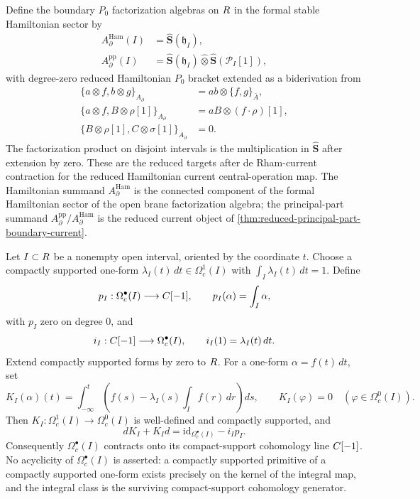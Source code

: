 \documentclass[11pt]{memoir}
\begin{document}
\begin{constr}
  Define the boundary $P_0$ factorization algebras on $R$ in the
  formal stable Hamiltonian sector by
  \begin{align*}
    A_\partial^{\mathrm{Ham}}(I)
      &=\widehat{\mathbf S}(\mathfrak h_I),\\
    A_\partial^{\mathrm{pp}}(I)
      &=\widehat{\mathbf S}(\mathfrak h_I)\widehat\otimes
        \widehat{\mathbf S}(\mathcal P_I[1]),
  \end{align*}
  with degree-zero reduced Hamiltonian \(P_0\) bracket extended as a
  biderivation from
  \begin{align*}
    \{a\otimes f,b\otimes g\}_{A_\partial}&=ab\otimes\{f,g\}_{\bar A},\\
    \{a\otimes f,B\otimes\rho[1]\}_{A_\partial}
      &=aB\otimes(f\cdot\rho)[1],\\
    \{B\otimes\rho[1],C\otimes\sigma[1]\}_{A_\partial}&=0.
  \end{align*}
  The factorization product on disjoint intervals is the multiplication
  in $\widehat{\mathbf S}$ after extension by zero. These are the
  reduced targets after de Rham-current contraction for the reduced
  Hamiltonian current central-operation map. The Hamiltonian summand
  $A_\partial^{\mathrm{Ham}}$ is the connected component of the formal
  Hamiltonian sector of the open brane factorization algebra; the
  principal-part summand
  $A_\partial^{\mathrm{pp}}/A_\partial^{\mathrm{Ham}}$ is the reduced
  current object of
    \ref{thm:reduced-principal-part-boundary-current}.
\end{constr}

\begin{lem}
  \label{lem:compact-support-interval-contraction}
  Let \(I\subset R\) be a nonempty open interval, oriented by the coordinate
  \(t\). Choose a compactly supported one-form
  \(\lambda_I(t)\,dt\in\Omega^1_c(I)\) with
  \(\int_I\lambda_I(t)\,dt=1\). Define
  \[
    p_I:\Omega_c^\bullet(I)\longrightarrow C[-1],\qquad
    p_I(\alpha)=\int_I\alpha,
  \]
  with \(p_I\) zero on degree \(0\), and
  \[
    i_I:C[-1]\longrightarrow\Omega_c^\bullet(I),\qquad
    i_I(1)=\lambda_I(t)\,dt.
  \]
  Extend compactly supported forms by zero to \(R\). For a one-form
  \(\alpha=f(t)\,dt\), set
  \[
    K_I(\alpha)(t)
      =
      \int_{-\infty}^{t}
      \left(f(s)-\lambda_I(s)\int_I f(r)\,dr\right)ds,
    \qquad
    K_I(\varphi)=0\quad(\varphi\in\Omega^0_c(I)).
  \]
  Then \(K_I:\Omega^1_c(I)\to\Omega^0_c(I)\) is well-defined and
  compactly supported, and
  \[
    dK_I+K_I d=\mathrm{id}_{\Omega_c^\bullet(I)}-i_Ip_I.
  \]
  Consequently \(\Omega_c^\bullet(I)\) contracts onto its compact-support
  cohomology line \(C[-1]\). No acyclicity of
  \(\Omega_c^\bullet(I)\) is asserted: a compactly supported primitive
  of a compactly supported one-form exists precisely on the kernel of
  the integral map, and the integral class is the surviving
  compact-support cohomology generator.
\end{lem}
\end{document}
